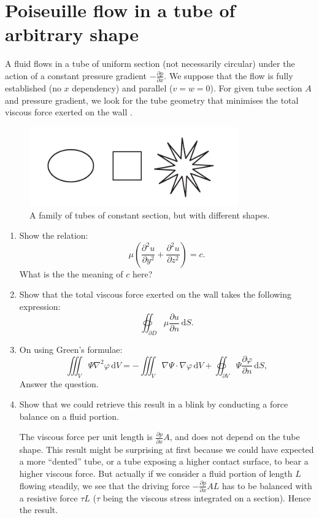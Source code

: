\documentclass[11pt,a4paper]{article}
\newcommand{\pd}[2]{\frac{\partial #1}{\partial #2}}
\begin{document}
\section{Poiseuille flow in a tube of arbitrary shape}
\noindent A fluid flows in a tube of uniform section (not necessarily circular) under the action of a constant pressure gradient $-\frac{\partial p}{\partial x}$. We suppose that the flow is fully established (no $x$ dependency) and parallel ($v = w = 0$). For given tube section $A$ and pressure gradient, we look for the tube geometry that minimises the total viscous force exerted on the wall \citep{Ockendon1995}.
\begin{figure}[h]
\begin{center}
\includegraphics[width=9cm]{poiseuille_shapes.pdf}
\end{center}
\caption{A family of tubes of constant section, but with different shapes.}
\end{figure}

\begin{enumerate}
\item Show the relation:
$$
\mu\left( \frac{\partial^2 u}{\partial y^2} + \frac{\partial^2 u}{\partial z^2} \right) = c.
$$
What is the the meaning of $c$ here?
\item Show that the total viscous force exerted on the wall takes the following expression:
$$
\oiint_{\partial D} \mu \frac{\partial u}{\partial n} \, \mathrm dS.
$$
\item On using Green's formulae:
$$
\iiint_V \Psi \nabla^2 \varphi\,\mathrm dV = - \iiint_V \nabla \Psi \cdot \nabla \varphi\,\mathrm dV + \oiint_{\partial V} \Psi \frac{\partial \varphi}{\partial n} \, \mathrm dS,
$$
Answer the question.
\item Show that we could retrieve this result in a blink by conducting a force balance on a fluid portion.
\begin{answer}
The viscous force per unit length is $\pd{p}{x} A$, and does not depend on the tube shape. This result might be surprising at first because we could have expected a more ``dented'' tube, or a tube exposing a higher contact surface, to bear a higher viscous force.
But actually if we consider a fluid portion of length $L$ flowing steadily, we see that the driving force $-\pd{p}{x} A L$ has to be balanced with a resistive force $\tau L$ ($\tau$ being the viscous stress integrated on a section). Hence the result.
\end{answer}

\end{enumerate}


\end{document}
